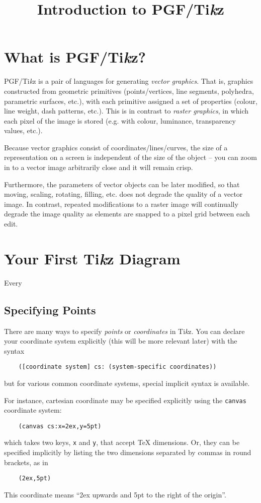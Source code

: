 \documentclass{article}
\theoremstyle{definition}
\theoremstyle{definition}
\theoremstyle{remark}
\newcommand{\Tikz}{Ti\textit{k}z{}}
\begin{document}
\title{Introduction to PGF/\Tikz{}}

\newpage

\section*{What is PGF/\Tikz{}?}

PGF/\Tikz{} is a pair of languages for generating \textit{vector graphics}. That is, graphics constructed from geometric primitives (points/vertices, line segments, polyhedra, parametric surfaces, etc.), with each primitive assigned a set of properties (colour, line weight, dash patterns, etc.). This is in contrast to \textit{raster graphics}, in which each pixel of the image is stored (e.g. with colour, luminance, transparency values, etc.).

Because vector graphics consist of coordinates/lines/curves, the size of a representation on a screen is independent of the size of the object -- you can zoom in to a vector image arbitrarily close and it will remain crisp.

Furthermore, the parameters of vector objects can be later modified, so that moving, scaling, rotating, filling, etc. does not degrade the quality of a vector image. In contrast, repeated modifications to a raster image will continually degrade the image quality as elements are snapped to a pixel grid between each edit.


\section*{Your First \Tikz{} Diagram}

Every 


\subsection*{Specifying Points}

There are many ways to specify \textit{points} or \textit{coordinates} in \Tikz{}. You can declare your coordinate system explicitly (this will be more relevant later) with the syntax
\begin{verbatim}
    ([coordinate system] cs: (system-specific coordinates))
\end{verbatim}
but for various common coordinate systems, special implicit syntax is available.

For instance, cartesian coordinate may be specified explicitly using the \verb|canvas| coordinate system:
\begin{verbatim}
    (canvas cs:x=2ex,y=5pt)
\end{verbatim}
which takes two keys, \verb|x| and \verb|y|, that accept \TeX{} dimensions. Or, they can be specified implicitly by listing the two dimensions separated by commas in round brackets, as in
\begin{verbatim}
    (2ex,5pt)
\end{verbatim}
This coordinate means ``2ex upwards and 5pt to the right of the origin''.
\end{document}
